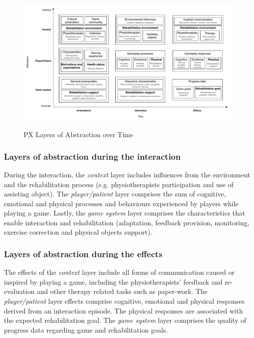 \begin{landscape}
\begin{figure}[p]
\myfloatalign
{\includegraphics[width=\linewidth]{gfx/model/pxModel}} \quad
\caption{\ac{PX} Layers of Abstraction over Time}\label{fig:pxModel}
\end{figure}
\end{landscape}

\subsubsection{Layers of abstraction during the interaction}
During the interaction, the \textit{context} layer includes influences from the environment and the rehabilitation process (e.g. physiotherapists participation and use of assisting object). The \textit{player/patient} layer comprises the sum of cognitive, emotional and physical processes and behaviours experienced by players while playing a game. Lastly, the \textit{game system} layer comprises the characteristics that enable interaction and rehabilitation (adaptation, feedback provision, monitoring, exercise correction and physical objects support).

\subsubsection{Layers of abstraction during the effects}
The effects of the \textit{context} layer include all forms of communication caused or inspired by playing a game, including the physiotherapists' feedback and re-evaluation and other therapy related tasks such as paper-work. The \textit{player/patient} layer effects comprise cognitive, emotional and physical responses derived from an interaction episode. The physical responses are associated with the expected rehabilitation goal. The \textit{game system} layer comprises the quality of progress data regarding game and rehabilitation goals.

